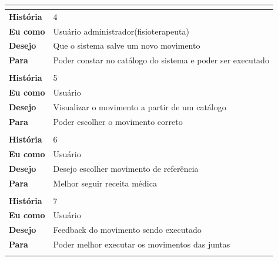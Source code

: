 \begin{table}[]
\begin{tabular}{|l|l|}
\multicolumn{2}{|l|}{}                                                       \\ \hline
\textbf{História} & 4                                                        \\ \hline
\textbf{Eu como}  & Usuário administrador(fisioterapeuta)                    \\ \hline
\textbf{Desejo}   & Que o sistema salve um novo movimento                    \\ \hline
\textbf{Para}     & Poder constar no catálogo do sistema e poder ser executado \\ \hline
\multicolumn{2}{|l|}{}                                                       \\ \hline
\textbf{História} & 5                                                        \\ \hline
\textbf{Eu como}  & Usuário                                                  \\ \hline
\textbf{Desejo}   & Visualizar o movimento a partir de um catálogo           \\ \hline
\textbf{Para}     & Poder escolher o movimento correto                       \\ \hline
\multicolumn{2}{|l|}{}                                                       \\ \hline

\textbf{História} & 6                                                        \\ \hline
\textbf{Eu como}  & Usuário                                                  \\ \hline
\textbf{Desejo}   & Desejo escolher movimento de referência                  \\ \hline
\textbf{Para}     & Melhor seguir receita médica                             \\ \hline
\multicolumn{2}{|l|}{}                                                       \\ \hline

\textbf{História} & 7                                                        \\ \hline
\textbf{Eu como}  & Usuário                                                  \\ \hline
\textbf{Desejo}   & Feedback do movimento sendo executado                    \\ \hline
\textbf{Para}     & Poder melhor executar os movimentos das juntas           \\ \hline
\multicolumn{2}{|l|}{}                                                       \\ \hline


\end{tabular}
\end{table}
